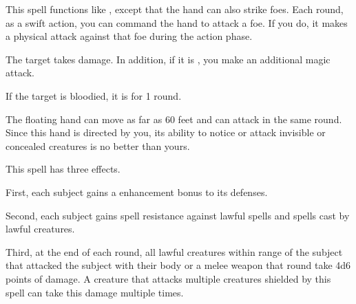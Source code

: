 \begin{spelleffect}
  This spell functions like , except that the hand can also strike foes. Each round, as a swift action, you can command the hand to attack a foe. If you do, it makes a physical attack against that foe during the action phase.
\end{spelleffect}
\begin{spellsuccess}
    The target takes damage. In addition, if it is \bloodied, you make an additional magic attack.
\end{spellsuccess}
\begin{spellsuccess}
    If the target is bloodied, it is \dazed for 1 round.
\end{spellsuccess}
\begin{spellnotes}
  The floating hand can move as far as 60 feet and can attack in the same round. Since this hand is directed by you, its ability to notice or attack invisible or concealed creatures is no better than yours.
\end{spellnotes}

\begin{spellsuccess}
  This spell has three effects.
  \par First, each subject gains a  enhancement bonus to its defenses.
  \par Second, each subject gains spell resistance against lawful spells and spells cast by lawful creatures.
  \par Third, at the end of each round, all lawful creatures within \rngclose range of the subject that attacked the subject with their body or a melee weapon that round take 4d6 points of damage. A creature that attacks multiple creatures shielded by this spell can take this damage multiple times.
\end{spellsuccess}

